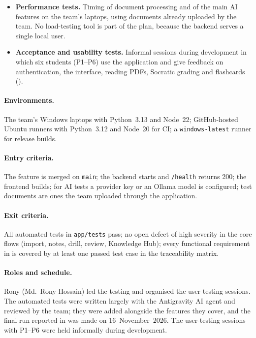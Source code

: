 \begin{itemize}[leftmargin=*]
    in  use only documents already uploaded by the team.
  \item \textbf{Performance tests.} Timing of document processing and of the main AI
    features on the team's laptops, using documents already uploaded by the team. No
    load-testing tool is part of the plan, because the backend serves a single local user.
  \item \textbf{Acceptance and usability tests.} Informal sessions during development in
    which six students (P1--P6) use the application and give feedback on authentication,
    the interface, reading PDFs, Socratic grading and flashcards ().
\end{itemize}

\paragraph{Environments.} The team's Windows laptops with Python~3.13 and Node~22;
GitHub-hosted Ubuntu runners with Python~3.12 and Node~20 for CI; a \texttt{windows-latest}
runner for release builds.

\paragraph{Entry criteria.} The feature is merged on \texttt{main}; the backend starts
and \texttt{/health} returns 200; the frontend builds; for AI tests a provider key or
an Ollama model is configured; test documents are ones the team uploaded through the
application.

\paragraph{Exit criteria.} All automated tests in \texttt{app/tests} pass; no open defect of high
severity in the core flows (import, notes, drill, review, Knowledge Hub); every
functional requirement in  is covered by at least one passed test case in
the traceability matrix.

\paragraph{Roles and schedule.} Rony (Md.~Rony Hossain) led the testing and organised the
user-testing sessions. The automated tests were written largely with the Antigravity AI
agent and reviewed by the team; they were added alongside the features they cover, and the
final run reported in  was made on 16~November~2026. The user-testing
sessions with P1--P6 were held informally during development.

